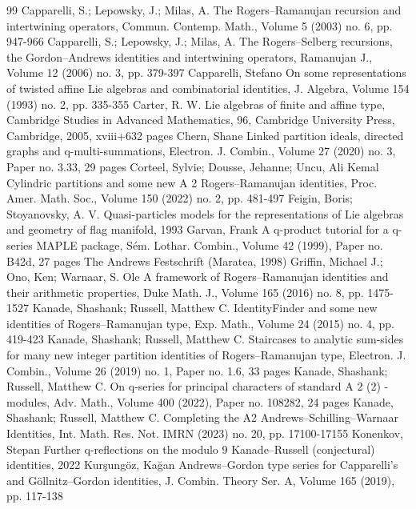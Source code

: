 \documentclass[10pt]{article}
\begin{document}
\begin{thebibliography}{99}
Capparelli, S.; Lepowsky, J.; Milas, A. The Rogers–Ramanujan recursion and intertwining operators, Commun. Contemp. Math., Volume 5 (2003) no. 6, pp. 947-966
Capparelli, S.; Lepowsky, J.; Milas, A. The Rogers–Selberg recursions, the Gordon–Andrews identities and intertwining operators, Ramanujan J., Volume 12 (2006) no. 3, pp. 379-397
Capparelli, Stefano On some representations of twisted affine Lie algebras and combinatorial identities, J. Algebra, Volume 154 (1993) no. 2, pp. 335-355
Carter, R. W. Lie algebras of finite and affine type, Cambridge Studies in Advanced Mathematics, 96, Cambridge University Press, Cambridge, 2005, xviii+632 pages
Chern, Shane Linked partition ideals, directed graphs and q-multi-summations, Electron. J. Combin., Volume 27 (2020) no. 3, Paper no. 3.33, 29 pages
Corteel, Sylvie; Dousse, Jehanne; Uncu, Ali Kemal Cylindric partitions and some new A 2  Rogers–Ramanujan identities, Proc. Amer. Math. Soc., Volume 150 (2022) no. 2, pp. 481-497
Feigin, Boris; Stoyanovsky, A. V. Quasi-particles models for the representations of Lie algebras and geometry of flag manifold, 1993
Garvan, Frank A q-product tutorial for a q-series MAPLE package, Sém. Lothar. Combin., Volume 42 (1999), Paper no. B42d, 27 pages The Andrews Festschrift (Maratea, 1998)
Griffin, Michael J.; Ono, Ken; Warnaar, S. Ole A framework of Rogers–Ramanujan identities and their arithmetic properties, Duke Math. J., Volume 165 (2016) no. 8, pp. 1475-1527
Kanade, Shashank; Russell, Matthew C. IdentityFinder and some new identities of Rogers–Ramanujan type, Exp. Math., Volume 24 (2015) no. 4, pp. 419-423
Kanade, Shashank; Russell, Matthew C. Staircases to analytic sum-sides for many new integer partition identities of Rogers–Ramanujan type, Electron. J. Combin., Volume 26 (2019) no. 1, Paper no. 1.6, 33 pages
Kanade, Shashank; Russell, Matthew C. On q-series for principal characters of standard A 2 (2) -modules, Adv. Math., Volume 400 (2022), Paper no. 108282, 24 pages
Kanade, Shashank; Russell, Matthew C. Completing the A2 Andrews–Schilling–Warnaar Identities, Int. Math. Res. Not. IMRN (2023) no. 20, pp. 17100-17155
Konenkov, Stepan Further q-reflections on the modulo 9 Kanade–Russell (conjectural) identities, 2022
Kurşungöz, Kağan Andrews–Gordon type series for Capparelli’s and Göllnitz–Gordon identities, J. Combin. Theory Ser. A, Volume 165 (2019), pp. 117-138

\end{thebibliography}
\end{document}
